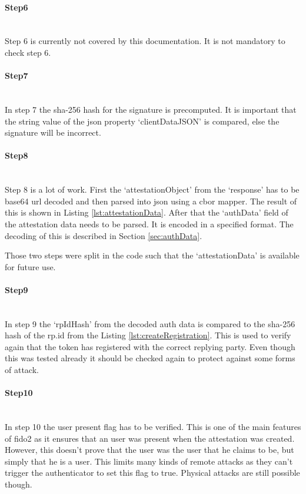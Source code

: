 \documentclass[a4paper, 11pt]{scrartcl}
\begin{document}
\paragraph{Step6}\hfill \\ 
Step 6 is currently not covered by this documentation. It is not mandatory to check step 6.

\paragraph{Step7}\hfill \\ 
In step 7 the \gls{sha-256} hash for the signature is precomputed. It is important that the string value of the json property `clientDataJSON' is compared, else the signature will be incorrect.

\paragraph{Step8}\hfill \\ 
Step 8 is a lot of work. First the `attestationObject' from the `response' has to be base64 url decoded and then parsed into \gls{json} using a \gls{cbor} mapper. The result of this is shown in Listing \ref{lst:attestationData}. After that the `authData' field of the attestation data needs to be parsed. It is encoded in a specified format. The decoding of this is described in Section \ref{sec:authData}. \cite{webauthn:authData}

Those two steps were split in the code such that the `attestationData' is available for future use.



\paragraph{Step9}\hfill \\ 
In step 9 the `rpIdHash' from the decoded auth data is compared to the \gls{sha-256} hash of the rp.id from the Listing \ref{lst:createRegistration}. This is used to verify again that the token has registered with the correct replying party. Even though this was tested already it should be checked again to protect against some forms of attack. 

\paragraph{Step10}\hfill \\ 
In step 10 the user present flag has to be verified. This is one of the main features of \gls{fido2} as it ensures that an user was present when the attestation was created. However, this doesn't prove that the user was the user that he claims to be, but simply that he is a user. This limits many kinds of remote attacks as they can't trigger the authenticator to set this flag to true. Physical attacks are still possible though.
\end{document}
